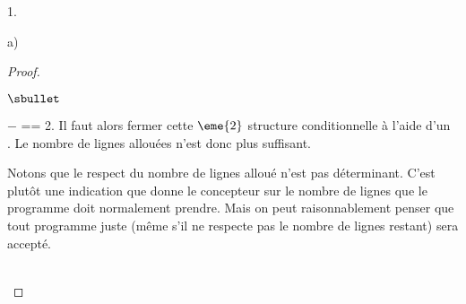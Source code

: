 \documentclass[11pt]{article}%
\begin{document}
\begin{noliste}{1.}
\begin{noliste}{a)}
\begin{proof}
\begin{remark}
\begin{noliste}{$\sbullet$}
\begin{noliste}{$-$}
{               == 2}. Il faut alors fermer cette
            $\eme{2}$ structure conditionnelle à l'aide d'un {\tt
              }. Le nombre de lignes allouées n'est donc
            plus suffisant.
          \end{noliste}
        \item Notons que le respect du nombre de lignes alloué n'est
          pas déterminant. C'est plutôt une indication que donne le
          concepteur sur le nombre de lignes que le programme doit
          normalement prendre. Mais on peut raisonnablement penser que
          tout programme juste (même s'il ne respecte pas le nombre de
          lignes restant) sera accepté.
        \end{noliste}
      \end{remark}~\\[-1.4cm]
    \end{proof}


    \newpage



\end{noliste}
\end{noliste}
\end{document}
